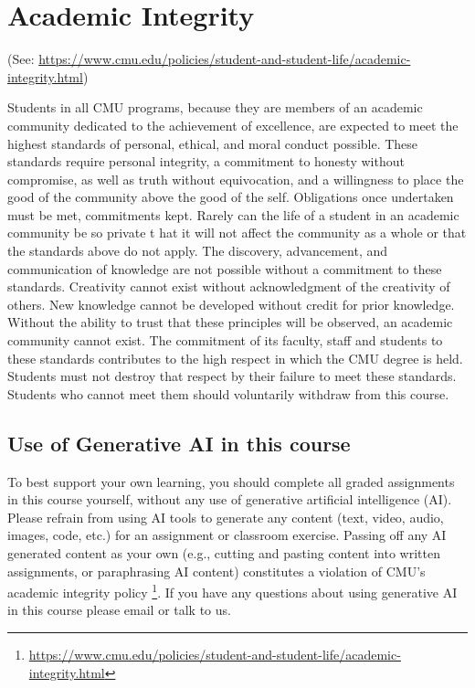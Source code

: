 \section{Academic Integrity}
\label{sec:cheating}

(See: {\footnotesize\url{https://www.cmu.edu/policies/student-and-student-life/academic-integrity.html}})

Students in all CMU programs, 
because they are members of an academic community dedicated to the achievement of excellence, 
are expected to meet the highest standards of personal, ethical, and moral conduct possible.
These standards require personal integrity, 
a commitment to honesty without compromise, 
as well as truth without equivocation, 
and a willingness to place the good of the community above the good of the self. 
Obligations once undertaken must be met, commitments kept.
Rarely can the life of a student in an academic community be so private t
hat it will not affect the community as a whole or that the standards above do not apply.
The discovery, advancement, and communication of knowledge 
are not possible without a commitment to these standards. 
Creativity cannot exist without acknowledgment of the creativity of others. 
New knowledge cannot be developed without credit for prior knowledge. 
Without the ability to trust that these principles will be observed, an academic community cannot exist.
The commitment of its faculty, staff and students to these standards contributes to the high respect in which the CMU degree is held. 
Students must not destroy that respect by their failure to meet these standards. 
Students who cannot meet them should voluntarily withdraw from this course.


\subsection{Use of Generative AI in this course}

To best support your own learning, 
you should complete all graded assignments in this course yourself, 
without any use of generative artificial intelligence (AI). 
Please refrain from using AI tools to generate any content 
(text, video, audio, images, code, etc.) 
for an assignment or classroom exercise. 
Passing off any AI generated content as your own 
(e.g., cutting and pasting content into written assignments, or paraphrasing AI content) 
constitutes a violation of CMU’s academic integrity policy%
\footnote{\url{https://www.cmu.edu/policies/student-and-student-life/academic-integrity.html}}. 
If you have any questions about using generative AI in this course please email or talk to us.

